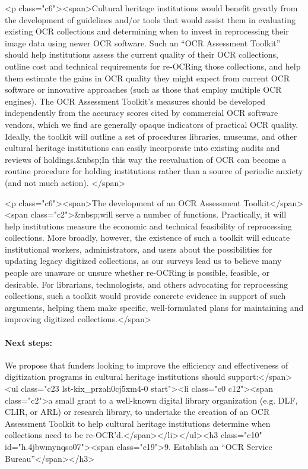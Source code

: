 \documentclass[twoside,11pt]{report}
\begin{document}
<p class="c6"><span>Cultural heritage institutions would benefit greatly from the development of guidelines and/or tools that would assist them in evaluating existing OCR collections and determining when to invest in reprocessing their image data using newer OCR software. Such an ``OCR Assessment Toolkit'' should help institutions assess the current quality of their OCR collections, outline cost and technical requirements for re-OCRing those collections, and help them estimate the gains in OCR quality they might expect from current OCR software or innovative approaches (such as those that employ multiple OCR engines). The OCR Assessment Toolkit's measures should be developed independently from the accuracy scores cited by commercial OCR software vendors, which we find are generally opaque indicators of practical OCR quality. Ideally, the toolkit will outline a set of procedures libraries, museums, and other cultural heritage institutions can easily incorporate into existing audits and reviews of holdings.&nbsp;In this way the reevaluation of OCR can become a routine procedure for holding institutions rather than a source of periodic anxiety (and not much action). </span>

<p class="c6"><span>The development of an OCR Assessment Toolkit</span><span class="c2">&nbsp;will serve a number of functions. Practically, it will help institutions measure the economic and technical feasibility of reprocessing collections. More broadly, however, the existence of such a toolkit will educate institutional workers, administrators, and users about the possibilities for updating legacy digitized collections, as our surveys lead us to believe many people are unaware or unsure whether re-OCRing is possible, feasible, or desirable. For librarians, technologists, and others advocating for reprocessing collections, such a toolkit would provide concrete evidence in support of such arguments, helping them make specific, well-formulated plans for maintaining and improving digitized collections.</span>

\paragraph{Next steps:} We propose that funders looking to improve the efficiency and effectiveness of digitization programs in cultural heritage institutions should support:</span><ul class="c23 lst-kix_przah0cj5xm4-0 start"><li class="c0 c12"><span class="c2">a small grant to a well-known digital library organization (e.g. DLF, CLIR, or ARL) or research library, to undertake the creation of an OCR Assessment Toolkit to help cultural heritage institutions determine when collections need to be re-OCR'd.</span></li></ul><h3 class="c10" id="h.4jbwmynqso07"><span class="c19">9. Establish an ``OCR Service Bureau''</span></h3>
\end{document}
